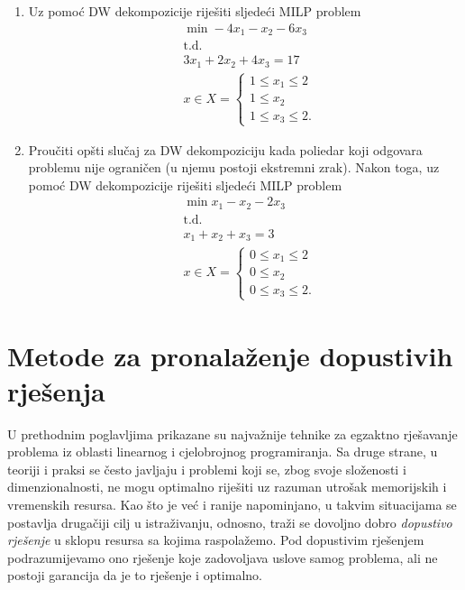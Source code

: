 \documentclass[b5paper, utf8, 11pt, colorlinks]{book}
\theoremstyle{definition}
\begin{document}
\begin{enumerate}
\item %
	Uz pomoć   DW dekompozicije riješiti sljedeći MILP problem
\begin{align*}
	 &\min -4x_1 - x_2 - 6 x_3 \\
	 &\mbox{t.d.} \\
	 & 3 x_1 + 2 x_2 + 4 x_3 = 17 \\
	 & x \in X = \begin{cases}
	 	1 \leq x_1 \leq 2 \\
	 	1 \leq x_2 \\
	    1 \leq x_3 \leq 2. 
	 \end{cases}
\end{align*}
\item %
    Proučiti opšti slučaj za DW dekompoziciju kada poliedar koji odgovara problemu nije ograničen (u njemu postoji ekstremni zrak). Nakon toga, uz pomoć DW dekompozicije riješiti sljedeći MILP problem
	\begin{align*}
		 &\min x_1 - x_2 - 2 x_3 \\
		 &\mbox{t.d.} \\
		 & x_1 + x_2 + x_3 = 3 \\
		 & x \in X = \begin{cases}
		 	        0 \leq x_1 \leq 2 \\
		 	        0 \leq x_2 \\
		 	        0 \leq x_3 \leq 2. 
		 \end{cases}
	\end{align*}

\end{enumerate}



 \chapter{Metode za pronalaženje dopustivih rješenja}\label{chp:heuristike}
 
 U prethodnim poglavljima prikazane su najvažnije tehnike za egzaktno rješavanje problema iz oblasti linearnog i cjelobrojnog programiranja. Sa druge strane, u teoriji i praksi se često javljaju i problemi koji se, zbog svoje složenosti i dimenzionalnosti, ne mogu optimalno riješiti uz razuman utrošak memorijskih i vremenskih resursa. Kao što je već i ranije napominjano, u takvim situacijama se postavlja drugačiji cilj u istraživanju, odnosno, traži se dovoljno dobro \emph{dopustivo rješenje} u sklopu resursa sa kojima raspolažemo. Pod dopustivim rješenjem podrazumijevamo ono rješenje koje zadovoljava uslove samog problema, ali ne postoji garancija da je to rješenje i optimalno.
 
\end{document}
